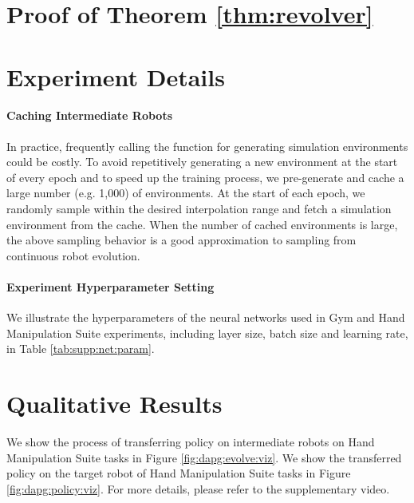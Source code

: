 

\onecolumn

\section{Proof of Theorem \ref{thm:revolver}} \label{sec:thm:proof}








\section{Experiment Details}

\paragraph{ Caching Intermediate Robots  }
In practice, frequently calling the function for generating simulation environments could be costly.
To avoid repetitively generating a new environment at the start of every epoch and to speed up the training process, we pre-generate and cache a large number (e.g. 1,000) of environments.
At the start of each epoch, we randomly sample within the desired interpolation range and fetch a simulation environment from the cache.
When the number of cached environments is large, the above sampling behavior is a good approximation to sampling from continuous robot evolution.



\paragraph{Experiment Hyperparameter Setting}
We illustrate the hyperparameters of the neural networks used in Gym and Hand Manipulation Suite experiments, including layer size, batch size and learning rate, in Table \ref{tab:supp:net:param}.





\section{Qualitative Results}

We show the process of transferring policy on intermediate robots on Hand Manipulation Suite tasks in Figure \ref{fig:dapg:evolve:viz}.
We show the transferred policy on the target robot of Hand Manipulation Suite tasks in Figure \ref{fig:dapg:policy:viz}. 
For more details, please refer to the supplementary video.





